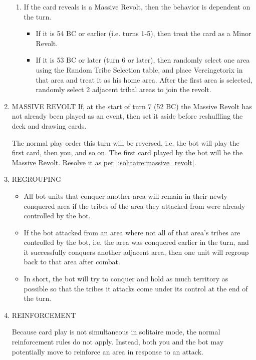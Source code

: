 \begin{enumerate}
\begin{enumerate}[leftmargin=0in]
    \item If the card reveals is a Massive Revolt, then the behavior is dependent on the turn.
    \begin{itemize}
      \item If it is 54 BC or earlier (i.e. turns 1-5), then treat the card as a Minor Revolt.
      \item \label{:solitaire:massive_revolt}If it is 53 BC or later (turn 6 or later), then randomly select one area using the Random Tribe Selection table, and place Vercingetorix in that area and treat it as his home area. After the first area is selected, randomly select 2 adjacent tribal areas to join the revolt.
    \end{itemize}
  \end{enumerate}
  
  \item MASSIVE REVOLT
  If, at the start of turn 7 (52 BC) the Massive Revolt has not already been played as an event, then set it aside before reshuffling the deck and drawing cards.
  
  The normal play order this turn will be reversed, i.e. the bot will play the first card, then you, and so on. The first card played by the bot will be the Massive Revolt. Resolve it as per \ref{:solitaire:massive_revolt}.
  
  \item REGROUPING
  \begin{itemize}
    \item All bot units that conquer another area will remain in their newly conquered area if the tribes of the area they attacked from were already controlled by the bot.
    
    \item If the bot attacked from an area where not all of that area's tribes are controlled by the bot, i.e. the area was conquered earlier in the turn, and it successfully conquers another adjacent area, then one unit will regroup back to that area after combat.
    
    \item In short, the bot will try to conquer and hold as much territory as possible so that the tribes it attacks come under its control at the end of the turn.
  \end{itemize}
  
  \item REINFORCEMENT
  
  Because card play is not simultaneous in solitaire mode, the normal reinforcement rules do not apply. Instead, both you and the bot may potentially move to reinforce an area in response to an attack.
  

\end{enumerate}
